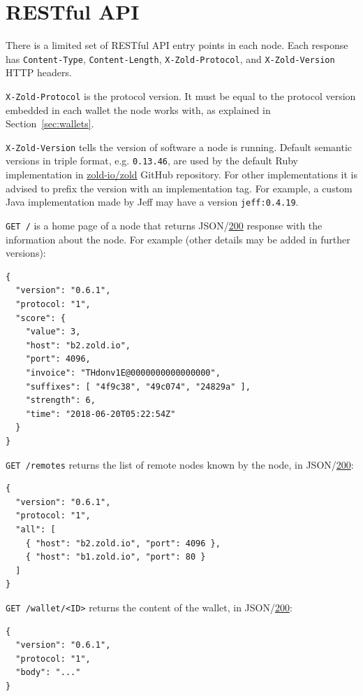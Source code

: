 \documentclass[11pt,oneside]{article}
\newcommand\dd[1]{\colorbox{gray!30}{\texttt{#1}}}
\begin{document}
\section{RESTful API}\label{sec:api}

There is a limited set of RESTful API entry points in each node.
Each response has \dd{Content-Type},
\dd{Content-Length}, \dd{X-Zold-Protocol}, and \dd{X-Zold-Version}
HTTP headers.

\dd{X-Zold-Protocol} is the protocol version.
It must be equal to the protocol version embedded in each wallet the
node works with, as explained in Section~\ref{sec:wallets}.

\dd{X-Zold-Version} tells the version of software a node is running.
Default semantic versions in triple format, e.g. \dd{0.13.46}, are used
by the default Ruby implementation in
\href{https://github.com/zold-io/zold}{zold-io/zold} GitHub repository.
For other implementations it is
advised to prefix the version with an implementation tag. For example,
a custom Java implementation made by Jeff may have a version \dd{jeff:0.4.19}.

\dd{GET /} is a home page of a node that returns
JSON/\href{https://www.w3.org/Protocols/rfc2616/rfc2616-sec10.html#sec10.2.1}{200}
response with the
information about the node. For example (other details may be added in
further versions):

\begin{verbatim}
{
  "version": "0.6.1",
  "protocol: "1",
  "score": {
    "value": 3,
    "host": "b2.zold.io",
    "port": 4096,
    "invoice": "THdonv1E@0000000000000000",
    "suffixes": [ "4f9c38", "49c074", "24829a" ],
    "strength": 6,
    "time": "2018-06-20T05:22:54Z"
  }
}
\end{verbatim}

\dd{GET /remotes} returns the list of remote nodes known by the node,
in JSON/\href{https://www.w3.org/Protocols/rfc2616/rfc2616-sec10.html#sec10.2.1}{200}:

\begin{verbatim}
{
  "version": "0.6.1",
  "protocol: "1",
  "all": [
    { "host": "b2.zold.io", "port": 4096 },
    { "host": "b1.zold.io", "port": 80 }
  ]
}\end{verbatim}

\dd{GET /wallet/<ID>} returns the content of the wallet, in
JSON/\href{https://www.w3.org/Protocols/rfc2616/rfc2616-sec10.html#sec10.2.1}{200}:

\begin{verbatim}
{
  "version": "0.6.1",
  "protocol: "1",
  "body": "..."
}\end{verbatim}
\end{document}
